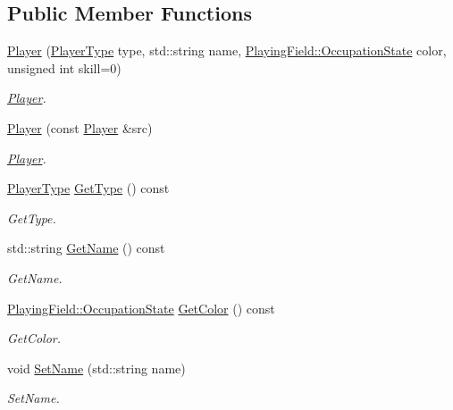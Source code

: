 \subsection*{Public Member Functions}
\begin{DoxyCompactItemize}
\item 
\hyperlink{classPlayer_a66f0cbcaa9de5f81fcbb4ee72d0f110e}{Player} (\hyperlink{classPlayer_a97dc3c423902370176605121e8f68415}{Player\-Type} type, std\-::string name, \hyperlink{classPlayingField_ac6df152a3f820aa04a00ab4df4a9d265}{Playing\-Field\-::\-Occupation\-State} color, unsigned int skill=0)
\begin{DoxyCompactList}\small\item\em \hyperlink{classPlayer}{Player}. \end{DoxyCompactList}\item 
\hyperlink{classPlayer_a6d2881f060b07eb48077cad6044fcd8f}{Player} (const \hyperlink{classPlayer}{Player} \&src)
\begin{DoxyCompactList}\small\item\em \hyperlink{classPlayer}{Player}. \end{DoxyCompactList}\item 
\hyperlink{classPlayer_a97dc3c423902370176605121e8f68415}{Player\-Type} \hyperlink{classPlayer_a4dbe0b63aab9abaeaa75612d1daf0fb4}{Get\-Type} () const 
\begin{DoxyCompactList}\small\item\em Get\-Type. \end{DoxyCompactList}\item 
std\-::string \hyperlink{classPlayer_aa5030908379dbc95594e4a9856758fef}{Get\-Name} () const 
\begin{DoxyCompactList}\small\item\em Get\-Name. \end{DoxyCompactList}\item 
\hyperlink{classPlayingField_ac6df152a3f820aa04a00ab4df4a9d265}{Playing\-Field\-::\-Occupation\-State} \hyperlink{classPlayer_a49f420e5204c895b9a94f07f6aaf639f}{Get\-Color} () const 
\begin{DoxyCompactList}\small\item\em Get\-Color. \end{DoxyCompactList}\item 
void \hyperlink{classPlayer_ac6727206628d233b9094c8e80f777c1d}{Set\-Name} (std\-::string name)
\begin{DoxyCompactList}\small\item\em Set\-Name. \end{DoxyCompactList}\item 

\end{DoxyCompactItemize}
